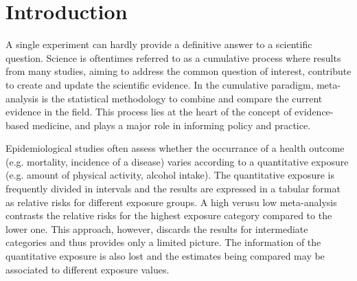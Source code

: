\documentclass[11pt,a4paper,twoside,openany]{book}\usepackage{knitr}
\begin{document}
{\begin{tabular}{ll}
\end{tabular}

\mainmatter
\pagestyle{mainmatter}



%

\chapter{Introduction}

A single experiment can hardly provide a definitive answer to a scientific question. Science is oftentimes referred to as a cumulative process where results from many studies, aiming to address the common question of interest, contribute to create and update the scientific evidence. In the cumulative paradigm, meta-analysis is the statistical methodology to combine and compare the current evidence in the field. This process lies at the heart of the concept of evidence-based medicine, and plays a major role in informing policy and practice.

Epidemiological studies often assess whether the occurrance of a health outcome (e.g. mortality, incidence of a disease) varies according to a quantitative exposure (e.g. amount of physical activity, alcohol intake). 
The quantitative exposure is frequently divided in intervals and the results are expressed in a tabular format as relative risks for different exposure groups. A high verusu low meta-analysis contrasts the relative risks for the highest exposure category compared to the lower one. This approach, however, discards the results for intermediate categories and thus provides only a limited picture. The information of the quantitative exposure is also lost and the estimates being compared may be associated to different exposure values.

}
\end{document}
